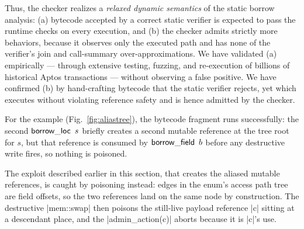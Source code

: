 Thus, the checker realizes a \emph{relaxed dynamic semantics} of the static borrow analysis: (a) bytecode accepted by a correct static verifier is expected to pass the runtime checks on every execution, and (b) the checker admits strictly more behaviors, because it observes only the executed path and has none of the verifier's join and call-summary over-approximations.
We have validated (a) empirically --- through extensive testing, fuzzing, and re-execution of billions of historical Aptos transactions --- without observing a false positive.
We have confirmed (b) by hand-crafting bytecode that the static verifier rejects, yet which executes without violating reference safety and is hence admitted by the checker.

For the example (Fig.~\ref{fig:aliastree}), the bytecode fragment runs successfully: the second $\mathop{\mathstrut{\mathsf{borrow\_loc}}}\nolimits\ s$ briefly creates a second mutable reference at the tree root for $s$, but that reference is consumed by $\mathop{\mathstrut{\mathsf{borrow\_field}}}\nolimits\ b$ before any destructive write fires, so nothing is poisoned.

The exploit described earlier in this section, that creates the aliased mutable references, is caught by poisoning instead: edges in the enum's access path tree are field offsets, so the two references land on the same node by construction.
The destructive |mem::swap| then poisons the still-live payload reference |c| sitting at a descendant place, and the |admin_action(c)| aborts because it is |c|'s use.


